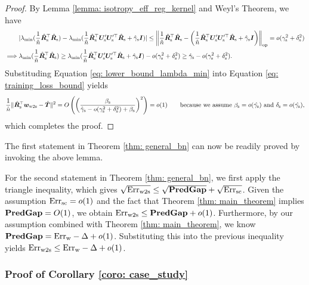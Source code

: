\begin{proof}
By Lemma \ref{lemma: isotropy_eff_reg_kernel} and Weyl's Theorem, we have
\begin{align}
    \nonumber
   & | \lambda_{\min}(  \frac{1}{\hat{n}}\hat{{\bm{R}}}_{\text{s}}^\top \hat{{\bm{R}}}_{\text{s}} ) - \lambda_{\min}( \frac{1}{\hat{n}}\hat{{\bm{R}}}_{\text{s}}^\top{\bm{U}}_{\text{s}}'{\bm{U}}_{\text{s}}'^\top\hat{{\bm{R}}}_{\text{s}} + \hat{\gamma}_{\text{s}}{\bm{I}}  ) | \leq \left\lVert  \frac{1}{\hat{n}}\hat{{\bm{R}}}_{\text{s}}^\top \hat{{\bm{R}}}_{\text{s}} - \left( \frac{1}{\hat{n}}\hat{{\bm{R}}}_{\text{s}}^\top{\bm{U}}_{\text{s}}'{\bm{U}}_{\text{s}}'^\top\hat{{\bm{R}}}_{\text{s}} + \hat{\gamma}_{\text{s}}{\bm{I}}  \right)  \right\rVert_{\mathrm{op}} =o(\gamma_{\text{s}}^2+\delta_{\text{s}}^2)  \\
   \label{eq: lower_bound_lambda_min}
   \implies & \lambda_{\min}(  \frac{1}{\tilde{n}}\hat{{\bm{R}}}_{\text{s}}^\top \hat{{\bm{R}}}_{\text{s}} )  \geq \lambda_{\min}( \frac{1}{\hat{n}}\hat{{\bm{R}}}_{\text{s}}^\top{\bm{U}}_{\text{s}}'{\bm{U}}_{\text{s}}'^\top\hat{{\bm{R}}}_{\text{s}} + \hat{\gamma}_{\text{s}}{\bm{I}}  )-o(\gamma_{\text{s}}^2+\delta_{\text{s}}^2)  \geq \hat{\gamma}_{\text{s}}-o(\gamma_{\text{s}}^2+\delta_{\text{s}}^2).
\end{align}
Substituding Equation \ref{eq: lower_bound_lambda_min} into Equation \ref{eq: training_loss_bound} yields
\begin{align}
    \nonumber
    \frac{1}{\hat{n}}\| \hat{{\bm{R}}}_{\text{s}}^\top{\bm{w}}_{\text{w2s}} - \hat{{\bm{T}}}   \|^2 =O \left( \left(  
    \frac{\beta_{\text{s}}}{\hat{\gamma}_{\text{s}}-o(\gamma_{\text{s}}^2+\delta_{\text{s}}^2) +\beta_{\text{s}} } \right)^2 \right) = o(1)   \quad\quad\text{because we assume $\beta_{\text{s}}=o(\hat{\gamma_{\text{s}}})$ and $\delta_{\text{s}}=o(\hat{\gamma_{\text{s}}})$},
\end{align}
which completes the proof.
\end{proof}

The first statement in Theorem \ref{thm: general_bn} can now be readily proved by invoking the above lemma.

For the second statement in Theorem \ref{thm: general_bn}, we first apply the triangle inequality, which gives $\sqrt{\text{Err}_{\text{w2s}}} \leq \sqrt{\textbf{PredGap}{}} +\sqrt{\text{Err}_{\text{sc}}}$. Given the assumption $\text{Err}_{\text{sc}}=o(1)$ and the fact that Theorem \ref{thm: main_theorem} implies $\textbf{PredGap}{}=O(1)$, we obtain $\text{Err}_{\text{w2s}} \leq \textbf{PredGap}{} + o(1) $. Furthermore, by our assumption combined with Theorem \ref{thm: main_theorem}, we know $\textbf{PredGap}{} = \text{Err}_{\text{w}}-\Delta + o(1) $.  Substituting this into the previous inequality yields $\text{Err}_{\text{w2s}} \leq  \text{Err}_{\text{w}}-\Delta + o(1) $.


\subsubsection{Proof of Corollary \ref{coro: case_study}}\label{apdx: proof_case_study}

